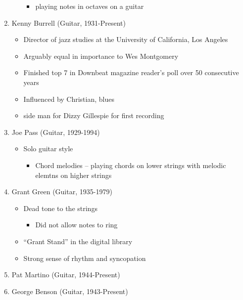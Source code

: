 \documentclass[]{article}
\providecommand{\tightlist}{%
  \setlength{\itemsep}{0pt}\setlength{\parskip}{0pt}}
\begin{document}
\begin{enumerate}
\begin{itemize}
    \begin{itemize}
    \tightlist
    \item
      playing notes in octaves on a guitar
    \end{itemize}
  \end{itemize}
\item
  Kenny Burrell (Guitar, 1931-Present)

  \begin{itemize}
  \tightlist
  \item
    Director of jazz studies at the University of California, Los
    Angeles
  \item
    Arguably equal in importance to Wes Montgomery
  \item
    Finished top 7 in Downbeat magazine reader's poll over 50
    consecutive years
  \item
    Influenced by Christian, blues
  \item
    side man for Dizzy Gillespie for first recording
  \end{itemize}
\item
  Joe Pass (Guitar, 1929-1994)

  \begin{itemize}
  \tightlist
  \item
    Solo guitar style

    \begin{itemize}
    \tightlist
    \item
      Chord melodies -- playing chords on lower strings with melodic
      elemtns on higher strings
    \end{itemize}
  \end{itemize}
\item
  Grant Green (Guitar, 1935-1979)

  \begin{itemize}
  \tightlist
  \item
    Dead tone to the strings

    \begin{itemize}
    \tightlist
    \item
      Did not allow notes to ring
    \end{itemize}
  \item
    ``Grant Stand'' in the digital library
  \item
    Strong sense of rhythm and syncopation
  \end{itemize}
\item
  Pat Martino (Guitar, 1944-Present)
\item
  George Benson (Guitar, 1943-Present)


\end{enumerate}
\end{document}
